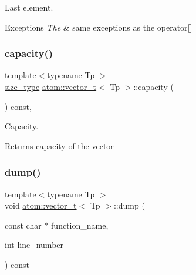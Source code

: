 Last element. 


\begin{DoxyExceptions}{Exceptions}
{\em The} & same exceptions as the operator\mbox{[}\mbox{]} \\
\hline
\end{DoxyExceptions}
\mbox{\label{classatom_1_1vector__t_ada6d9f1b78bbb338980c4bd714cd3096}} 
\subsubsection{\texorpdfstring{capacity()}{capacity()}}
{\footnotesize\ttfamily template$<$typename Tp $>$ \\
\hyperlink{classatom_1_1vector__t_a1790d79321f4fa8d2580474dd0f56033}{size\+\_\+type} \hyperlink{classatom_1_1vector__t}{atom\+::vector\+\_\+t}$<$ Tp $>$\+::capacity (\begin{DoxyParamCaption}{ }\end{DoxyParamCaption}) const\hspace{0.3cm}{\ttfamily [inline]}, {\ttfamily [noexcept]}}



Capacity. 

\begin{DoxyReturn}{Returns}
capacity of the vector 
\end{DoxyReturn}
\mbox{\label{classatom_1_1vector__t_a5dbc4a2fbead76e7bfb2105693bb9680}} 
\subsubsection{\texorpdfstring{dump()}{dump()}}
{\footnotesize\ttfamily template$<$typename Tp $>$ \\
void \hyperlink{classatom_1_1vector__t}{atom\+::vector\+\_\+t}$<$ Tp $>$\+::dump (\begin{DoxyParamCaption}\item[{const char $\ast$}]{function\+\_\+name,  }\item[{int}]{line\+\_\+number }\end{DoxyParamCaption}) const\hspace{0.3cm}{\ttfamily [private]}}




